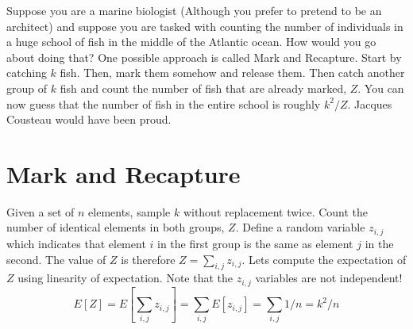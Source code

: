 \documentclass{article}
\begin{document}


Suppose you are a marine biologist (Although you prefer to pretend to be an architect) and
suppose you are tasked with counting the number of individuals in a huge school of fish in 
the middle of the Atlantic ocean. How would you go about doing that? 
One possible approach is called Mark and Recapture.
Start by catching $k$ fish. Then, mark them somehow 
and release them. Then catch another group of $k$ fish and count the number of fish that are already marked, $Z$.
You can now guess that the number of fish in the entire school is roughly $k^2/Z$.
Jacques Cousteau would have been proud.

\section*{Mark and Recapture}
Given a set of $n$ elements, sample $k$ without replacement twice.
Count the number of identical elements in both groups, $Z$.
Define a random variable $z_{i,j}$ which indicates that
element $i$ in the first group is the same as element $j$ in the second.
The value of $Z$ is therefore $Z = \sum_{i,j} z_{i,j}$.
Lets compute the expectation of $Z$ using linearity of expectation.
Note that the $z_{i,j}$ variables are not independent!
\begin{equation}
E[Z] = E[\sum_{i,j} z_{i,j}] = \sum_{i,j} E [z_{i,j}] = \sum_{i,j} 1/n = k^2/n
\end{equation}


%
\end{document}
